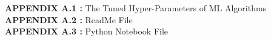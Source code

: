 \singlespacing
\textbf{APPENDIX A.1 :} The Tuned Hyper-Parameters of ML Algorithms\\
\textbf{APPENDIX A.2 :} ReadMe File\\
\textbf{APPENDIX A.3 :} Python Notebook File\\
\newpage